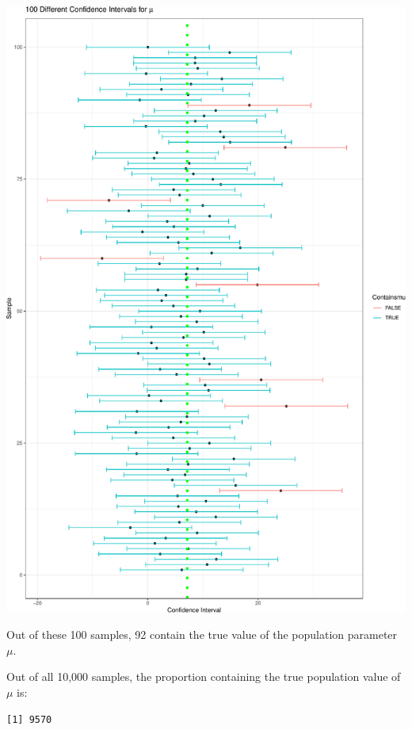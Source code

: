 \documentclass[
  letterpaper,
  DIV=11,
  numbers=noendperiod]{scrreprt}
\newenvironment{Shaded}{\begin{snugshade}}{\end{snugshade}}
\newcommand{\ConstantTok}[1]{\textcolor[rgb]{0.56,0.35,0.01}{#1}}
\newcommand{\FunctionTok}[1]{\textcolor[rgb]{0.28,0.35,0.67}{#1}}
\newcommand{\NormalTok}[1]{\textcolor[rgb]{0.00,0.23,0.31}{#1}}
\newcommand{\SpecialCharTok}[1]{\textcolor[rgb]{0.37,0.37,0.37}{#1}}
\begin{document}
\includegraphics{Ch3_files/figure-pdf/unnamed-chunk-40-1.pdf}

Out of these 100 samples, 92 contain the true value of the population
parameter \(\mu\).

Out of all 10,000 samples, the proportion containing the true population
value of \(\mu\) is:

\begin{Shaded}
\end{Shaded}

\begin{verbatim}
[1] 9570
\end{verbatim}
\end{document}
